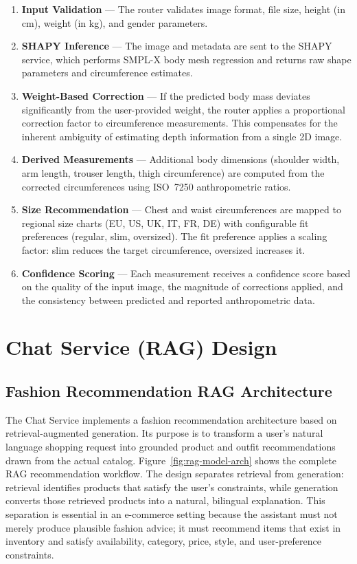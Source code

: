 \begin{enumerate}[leftmargin=*]
    \item \textbf{Input Validation} — The router validates image format, file size, height (in cm), weight (in kg), and gender parameters.

    \item \textbf{SHAPY Inference} — The image and metadata are sent to the SHAPY service, which performs SMPL-X body mesh regression and returns raw shape parameters and circumference estimates.

    \item \textbf{Weight-Based Correction} — If the predicted body mass deviates significantly from the user-provided weight, the router applies a proportional correction factor to circumference measurements. This compensates for the inherent ambiguity of estimating depth information from a single 2D image.

    \item \textbf{Derived Measurements} — Additional body dimensions (shoulder width, arm length, trouser length, thigh circumference) are computed from the corrected circumferences using ISO~7250 anthropometric ratios.

    \item \textbf{Size Recommendation} — Chest and waist circumferences are mapped to regional size charts (EU, US, UK, IT, FR, DE) with configurable fit preferences (regular, slim, oversized). The fit preference applies a scaling factor: slim reduces the target circumference, oversized increases it.

    \item \textbf{Confidence Scoring} — Each measurement receives a confidence score based on the quality of the input image, the magnitude of corrections applied, and the consistency between predicted and reported anthropometric data.
\end{enumerate}

\section{Chat Service (RAG) Design}

\subsection{Fashion Recommendation RAG Architecture}
\label{sec:rag-architecture}

The Chat Service implements a fashion recommendation architecture based on retrieval-augmented generation. Its purpose is to transform a user's natural language shopping request into grounded product and outfit recommendations drawn from the actual catalog. Figure~\ref{fig:rag-model-arch} shows the complete RAG recommendation workflow. The design separates retrieval from generation: retrieval identifies products that satisfy the user's constraints, while generation converts those retrieved products into a natural, bilingual explanation. This separation is essential in an e-commerce setting because the assistant must not merely produce plausible fashion advice; it must recommend items that exist in inventory and satisfy availability, category, price, style, and user-preference constraints.

